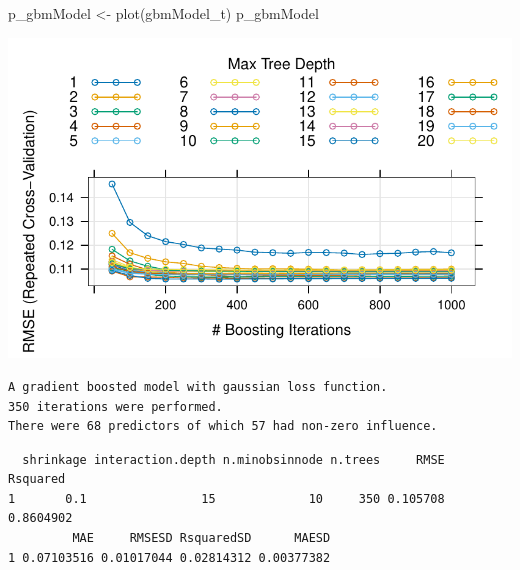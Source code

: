 \documentclass[
  letterpaper,
  DIV=11,
  numbers=noendperiod]{scrartcl}
\newenvironment{Shaded}{\begin{snugshade}}{\end{snugshade}}
\newcommand{\FunctionTok}[1]{\textcolor[rgb]{0.28,0.35,0.67}{#1}}
\newcommand{\NormalTok}[1]{\textcolor[rgb]{0.00,0.23,0.31}{#1}}
\newcommand{\OtherTok}[1]{\textcolor[rgb]{0.00,0.23,0.31}{#1}}
\newcommand{\SpecialCharTok}[1]{\textcolor[rgb]{0.37,0.37,0.37}{#1}}
\begin{document}
\begin{Shaded}
\begin{Highlighting}[]
\NormalTok{p\_gbmModel }\OtherTok{\textless{}{-}} \FunctionTok{plot}\NormalTok{(gbmModel\_t)}
\NormalTok{p\_gbmModel}
\end{Highlighting}
\end{Shaded}

\includegraphics{MachineLearning_StaticPatterNN_Report_files/figure-pdf/hyperparameter-tuning-5.pdf}

\begin{Shaded}
\end{Shaded}

\begin{verbatim}
A gradient boosted model with gaussian loss function.
350 iterations were performed.
There were 68 predictors of which 57 had non-zero influence.
\end{verbatim}

\begin{Shaded}
\end{Shaded}

\begin{verbatim}
  shrinkage interaction.depth n.minobsinnode n.trees     RMSE  Rsquared
1       0.1                15             10     350 0.105708 0.8604902
         MAE     RMSESD RsquaredSD      MAESD
1 0.07103516 0.01017044 0.02814312 0.00377382
\end{verbatim}
\end{document}
